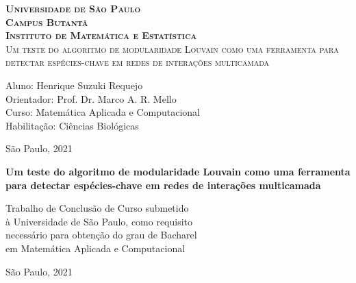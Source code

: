 \thispagestyle{empty}
\begin{center}
    \vspace*{1cm}
    \textbf{\textsc{Universidade de São Paulo\\Campus Butantã\\Instituto de Matemática e Estatística}}\\

    
    \vskip 4cm
    \textsc{\Large{Um teste do algoritmo de modularidade Louvain como uma ferramenta para detectar espécies-chave em redes de interações multicamada}}
    
    \vskip 4cm
    {\large{Aluno: Henrique Suzuki Requejo\\
    Orientador: Prof. Dr. Marco A. R. Mello \\
    Curso: Matemática Aplicada e Computacional\\
    Habilitação: Ciências Biológicas\\}}
    
    \vskip 4cm
    \normalsize{São Paulo, 2021}
\end{center}

\newpage
\thispagestyle{empty}
    \begin{center}
        \vspace*{2.3 cm}
        \textbf{\Large{Um teste do algoritmo de modularidade Louvain como uma ferramenta para detectar espécies-chave em redes de interações multicamada}}\\
        \vspace*{2 cm}
    \end{center}

    \vskip 2cm

    \begin{flushright}
    Trabalho de Conclusão de Curso submetido \\ à Universidade de São Paulo, como requisito \\ necessário para obtenção do grau de Bacharel \\ em Matemática Aplicada e Computacional
    \end{flushright}
 \vskip 6cm
 \begin{center}
    São Paulo, 2021
 \end{center}
\pagebreak